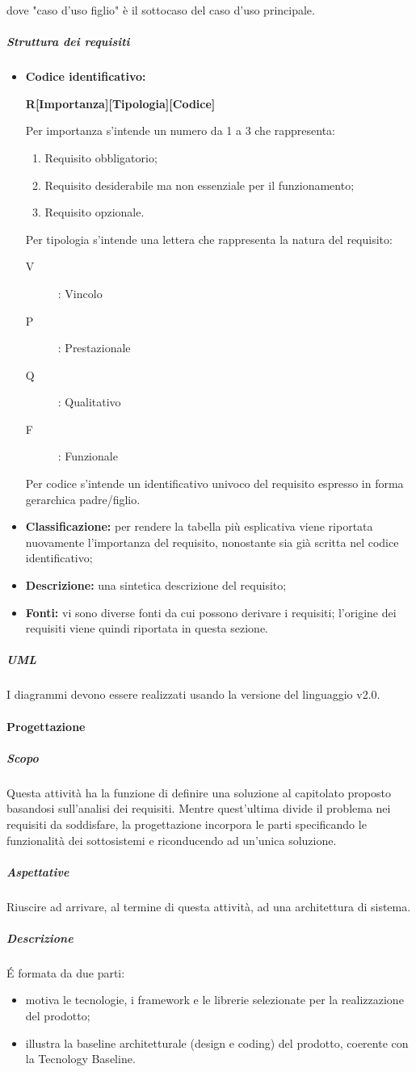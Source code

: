 dove "caso d'uso figlio" è il sottocaso del caso d'uso principale.
\subparagraph{Struttura dei requisiti} \label{para:requisiti}
\begin{itemize}
\item \textbf{Codice identificativo:} 
\begin{center}
\textbf{R[Importanza][Tipologia][Codice]}
\end{center}
 		
Per importanza s'intende un numero da 1 a 3 che rappresenta:
\begin{enumerate}
\item Requisito obbligatorio;
\item Requisito desiderabile ma non essenziale per il funzionamento;
\item Requisito opzionale.
\end{enumerate}
Per tipologia s'intende una lettera che rappresenta la natura del requisito:
\begin{description}
\item[V]: Vincolo
\item[P]: Prestazionale
\item[Q]: Qualitativo
\item[F]: Funzionale
\end{description}
Per codice s'intende un identificativo univoco del requisito espresso in forma gerarchica padre/figlio.
\item \textbf{Classificazione:} per rendere la tabella più esplicativa viene riportata nuovamente l'importanza del requisito, nonostante sia già scritta nel codice identificativo;
\item \textbf{Descrizione:} una sintetica descrizione del requisito;
\item \textbf{Fonti:} vi sono diverse fonti da cui possono derivare i requisiti; l'origine dei requisiti viene quindi riportata in questa sezione. 
\end{itemize}
\subparagraph{UML}
I diagrammi  devono essere realizzati usando la versione del linguaggio v2.0.
\paragraph{Progettazione}
\subparagraph{Scopo}
Questa attività ha la funzione di definire una soluzione al capitolato proposto basandosi sull'analisi dei requisiti.
Mentre quest'ultima divide il problema nei requisiti da soddisfare, la progettazione incorpora le parti specificando le funzionalità dei sottosistemi e riconducendo ad un'unica soluzione.
\subparagraph{Aspettative}
Riuscire ad arrivare, al termine di questa attività, ad una architettura di sistema.
\subparagraph{Descrizione}
\'E formata da due parti:
\begin{itemize}
\item {} motiva le tecnologie, i framework e le librerie selezionate per la realizzazione del prodotto;
\item {} illustra la baseline architetturale (design e coding) del prodotto, coerente con la Tecnology Baseline.
\end{itemize}

